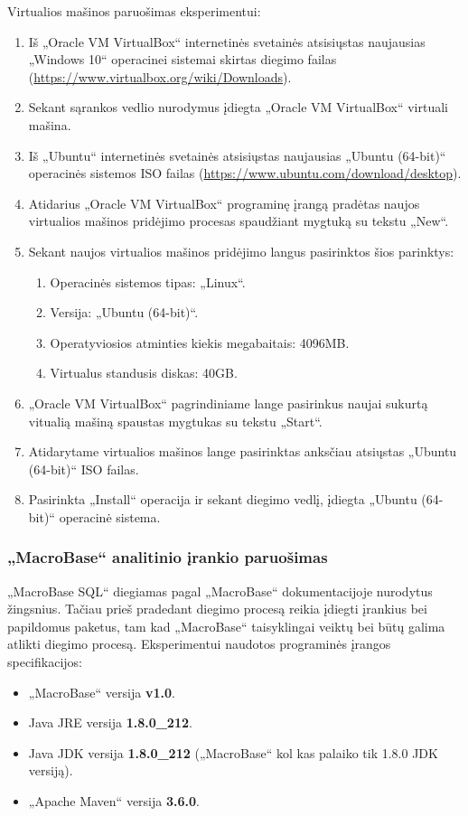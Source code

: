 \documentclass{VUMIFPSbakalaurinis}
\begin{document}
Virtualios mašinos paruošimas eksperimentui:
\begin{enumerate}
	\item Iš „Oracle VM VirtualBox“ internetinės svetainės atsisiųstas naujausias „Windows 10“ operacinei sistemai skirtas diegimo failas (\url{https://www.virtualbox.org/wiki/Downloads}).
	\item Sekant sąrankos vedlio nurodymus įdiegta „Oracle VM VirtualBox“ virtuali mašina.
	\item Iš „Ubuntu“ internetinės svetainės atsisiųstas naujausias „Ubuntu (64-bit)“ operacinės sistemos ISO failas (\url{https://www.ubuntu.com/download/desktop}).
	\item Atidarius „Oracle VM VirtualBox“ programinę įrangą pradėtas naujos virtualios mašinos pridėjimo procesas spaudžiant mygtuką su tekstu „New“.
	\item Sekant naujos virtualios mašinos pridėjimo langus pasirinktos šios parinktys:
		\begin{enumerate}
			\item Operacinės sistemos tipas: „Linux“.
			\item Versija: „Ubuntu (64-bit)“.
			\item Operatyviosios atminties kiekis megabaitais: 4096MB.
			\item Virtualus standusis diskas: 40GB.
		\end{enumerate}
	\item „Oracle VM VirtualBox“ pagrindiniame lange pasirinkus naujai sukurtą vitualią mašiną spaustas mygtukas su tekstu „Start“.
	\item Atidarytame virtualios mašinos lange pasirinktas anksčiau atsiųstas „Ubuntu (64-bit)“ ISO failas.
	\item Pasirinkta „Install“ operacija ir sekant diegimo vedlį, įdiegta „Ubuntu (64-bit)“ operacinė sistema.	
\end{enumerate}

\subsubsection{„MacroBase“ analitinio įrankio paruošimas}
„MacroBase SQL“ diegiamas pagal „MacroBase“ dokumentacijoje nurodytus žingsnius. Tačiau prieš pradedant diegimo procesą reikia įdiegti įrankius bei papildomus paketus, tam kad „MacroBase“ taisyklingai veiktų bei būtų galima atlikti diegimo procesą. Eksperimentui naudotos programinės įrangos specifikacijos:
\begin{itemize}
	\item „MacroBase“ versija \textbf{v1.0}.
	\item Java JRE versija \textbf{1.8.0\_212}.
	\item Java JDK versija \textbf{1.8.0\_212} („MacroBase“ kol kas palaiko tik 1.8.0 JDK versiją).
	\item „Apache Maven“ versija \textbf{3.6.0}.
\end{itemize}
\end{document}
